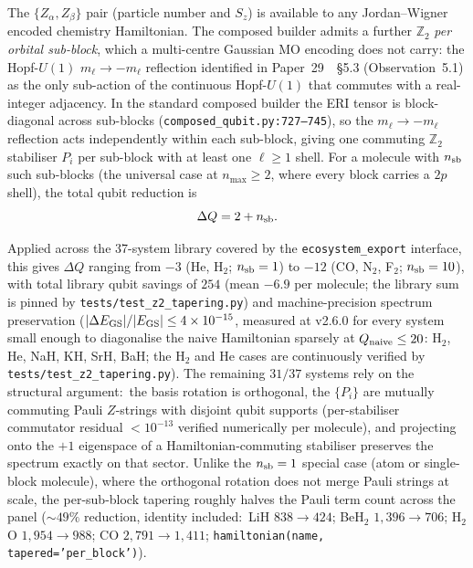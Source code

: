 \documentclass[aps,pra,twocolumn,superscriptaddress,longbibliography]{revtex4-2}
\begin{document}
The $\{Z_\alpha, Z_\beta\}$ pair (particle number and $S_z$) is
available to any Jordan--Wigner encoded chemistry Hamiltonian.
The composed builder admits a further $\mathbb{Z}_2$ \emph{per orbital
sub-block}, which a multi-centre Gaussian MO encoding does not carry: the Hopf-$U(1)$
$m_\ell \to -m_\ell$ reflection identified in
Paper~29~\cite{loutey_paper29}~\S{}5.3 (Observation~5.1) as the
only sub-action of the continuous Hopf-$U(1)$ that commutes with a real-integer
adjacency.  In the standard composed builder the ERI tensor is
block-diagonal across sub-blocks
(\texttt{composed\_qubit.py:727--745}), so the $m_\ell \to -m_\ell$
reflection acts independently within each sub-block, giving one
commuting $\mathbb{Z}_2$ stabiliser $P_i$ per sub-block with at
least one $\ell \ge 1$ shell.  For a molecule with $n_{\rm sb}$
such sub-blocks (the universal case at $n_{\max} \ge 2$, where
every block carries a $2p$ shell), the total qubit reduction is
\begin{equation}
  \Delta Q = 2 + n_{\rm sb}.
\end{equation}

Applied across the 37-system library covered by the
\texttt{ecosystem\_export} interface, this gives $\Delta Q$ ranging
from $-3$ (He, H$_2$; $n_{\rm sb} = 1$) to $-12$ (CO, N$_2$, F$_2$;
$n_{\rm sb} = 10$), with total library qubit savings of $254$
(mean $-6.9$ per molecule; the library sum is pinned by
\texttt{tests/test\_z2\_tapering.py}) and machine-precision spectrum
preservation ($|\Delta E_{\rm GS}|/|E_{\rm GS}| \le 4 \times 10^{-15}$,
measured at v2.6.0 for every system small enough to diagonalise the
naive Hamiltonian sparsely at $Q_{\rm naive} \le 20$: H$_2$, He,
NaH, KH, SrH, BaH; the H$_2$ and He cases are continuously verified by
\texttt{tests/test\_z2\_tapering.py}).  The remaining $31/37$ systems rely on the
structural argument:\ the basis rotation is orthogonal, the
$\{P_i\}$ are mutually commuting Pauli $Z$-strings with disjoint
qubit supports (per-stabiliser commutator residual $< 10^{-13}$
verified numerically per molecule), and projecting onto the $+1$
eigenspace of a Hamiltonian-commuting stabiliser preserves the
spectrum exactly on that sector.  Unlike the $n_{\rm sb}=1$
special case (atom or single-block molecule), where the orthogonal
rotation does not merge Pauli strings at scale, the per-sub-block
tapering roughly halves the Pauli term count across the panel
($\sim 49\%$ reduction, identity included:\ LiH $838 \to 424$;
BeH$_2$ $1{,}396 \to 706$; H$_2$O $1{,}954 \to 988$; CO $2{,}791 \to 1{,}411$;
\texttt{hamiltonian(name, tapered='per\_block')}).
\end{document}
